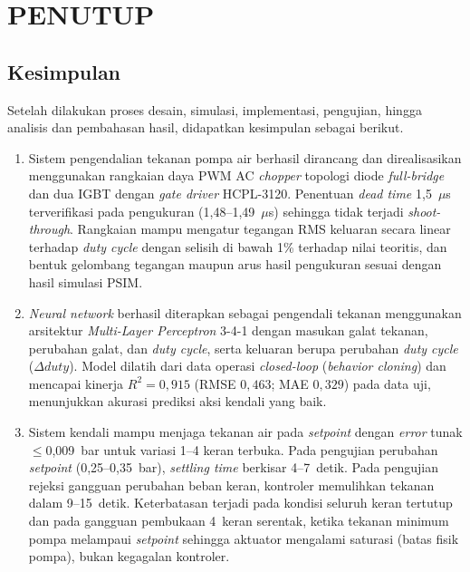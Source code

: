 ﻿\chapter{PENUTUP}
\label{chap:penutup}


\section{Kesimpulan}
\label{sec:kesimpulan}

Setelah dilakukan proses desain, simulasi, implementasi, pengujian, hingga
analisis dan pembahasan hasil, didapatkan kesimpulan sebagai berikut.

\begin{enumerate}[nolistsep]

  \item Sistem pengendalian tekanan pompa air berhasil dirancang dan
        direalisasikan menggunakan rangkaian daya PWM AC \emph{chopper}
        topologi diode \emph{full-bridge} dan dua IGBT dengan \emph{gate driver}
        HCPL-3120. Penentuan \emph{dead time} 1{,}5~$\mu$s terverifikasi
        pada pengukuran (1{,}48--1{,}49~$\mu$s) sehingga tidak terjadi
        \emph{shoot-through}. Rangkaian mampu mengatur tegangan RMS keluaran
        secara linear terhadap \emph{duty cycle} dengan selisih di bawah 1\%
        terhadap nilai teoritis, dan bentuk gelombang tegangan maupun arus
        hasil pengukuran sesuai dengan hasil simulasi PSIM.

  \item \emph{Neural network} berhasil diterapkan sebagai pengendali tekanan
        menggunakan arsitektur \emph{Multi-Layer Perceptron} 3-4-1 dengan
        masukan galat tekanan, perubahan galat, dan \emph{duty cycle}, serta
        keluaran berupa perubahan \emph{duty cycle} ($\Delta duty$). Model
        dilatih dari data operasi \emph{closed-loop} (\emph{behavior cloning})
        dan mencapai kinerja $R^2 = 0{,}915$ (RMSE $0{,}463$; MAE $0{,}329$)
        pada data uji, menunjukkan akurasi prediksi aksi kendali yang baik.

  \item Sistem kendali mampu menjaga tekanan air pada \emph{setpoint} dengan
        \emph{error} tunak $\leq$0{,}009~bar untuk variasi 1--4 keran terbuka.
        Pada pengujian perubahan \emph{setpoint} (0{,}25--0{,}35~bar),
        \emph{settling time} berkisar 4--7~detik. Pada pengujian rejeksi
        gangguan perubahan beban keran, kontroler memulihkan tekanan dalam
        9--15~detik. Keterbatasan terjadi pada kondisi seluruh keran tertutup
        dan pada gangguan pembukaan 4~keran serentak, ketika tekanan minimum
        pompa melampaui \emph{setpoint} sehingga aktuator mengalami saturasi
        (batas fisik pompa), bukan kegagalan kontroler.

\end{enumerate}

